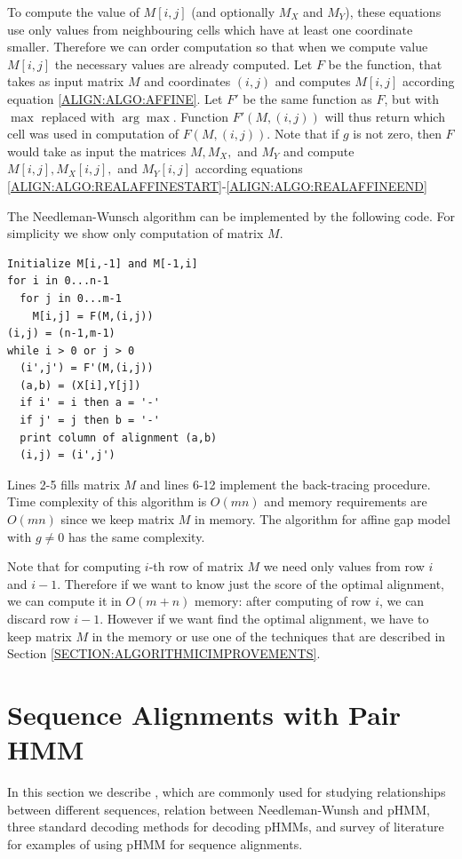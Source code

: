To compute the
value of $M[i,j]$ (and optionally $M_X$ and $M_Y$), these equations use only values
from neighbouring cells which have at least one coordinate smaller. 
Therefore we can order computation so that when we compute value $M[i,j]$ the
necessary values are already computed.
Let $F$ be
the function, that takes as input matrix $M$  and coordinates $(i,j)$ and computes $M[i,j]$ according equation
\ref{ALIGN:ALGO:AFFINE}.  Let $F'$ be the
same function as $F$, but with $\max$ replaced with $\arg\max$.  Function
$F'(M,(i,j))$ will thus return which cell was used in computation of $F(M,(i,j))$.
Note that if $g$ is not zero, then $F$ would take as input the matrices $M,M_X,$
and $M_Y$ and compute $M[i,j],M_X[i,j],$ and $M_Y[i,j]$ according 
 equations
\ref{ALIGN:ALGO:REALAFFINESTART}-\ref{ALIGN:ALGO:REALAFFINEEND}

The Needleman-Wunsch algorithm can be implemented by the following code. For simplicity 
we show only computation of matrix $M$.

\lstset{showstringspaces=false}
\begin{lstlisting}
Initialize M[i,-1] and M[-1,i]
for i in 0...n-1
  for j in 0...m-1
    M[i,j] = F(M,(i,j))
(i,j) = (n-1,m-1)
while i > 0 or j > 0
  (i',j') = F'(M,(i,j))
  (a,b) = (X[i],Y[j])
  if i' = i then a = '-'
  if j' = j then b = '-'
  print column of alignment (a,b)
  (i,j) = (i',j')
\end{lstlisting}

Lines 2-5 fills matrix $M$ and lines 6-12 implement the back-tracing procedure.
Time complexity of this algorithm is $O(mn)$ and memory requirements are $O(mn)$
since we keep matrix $M$ in memory. The algorithm for
affine gap model with $g\not=0$ has the same complexity.


Note that for computing  $i$-th row of matrix $M$ we need only values from row
$i$ and $i-1$. Therefore if we want to know just the score of the optimal
alignment,
we can compute it in $O(m+n)$ memory: after computing of row $i$, we can discard
row $i-1$. However if we want find the optimal alignment, we have to keep matrix
$M$ in the memory or use one of the techniques that are described in Section 
\ref{SECTION:ALGORITHMICIMPROVEMENTS}.

\section{Sequence Alignments with Pair HMM}\label{SECTION:ALIGNWITHPHMM}

In this section we describe ,
which are commonly used for studying relationships between different sequences,
relation between Needleman-Wunsh and pHMM, three standard decoding methods for
decoding pHMMs, and survey of literature for examples of using pHMM for
sequence alignments. 

